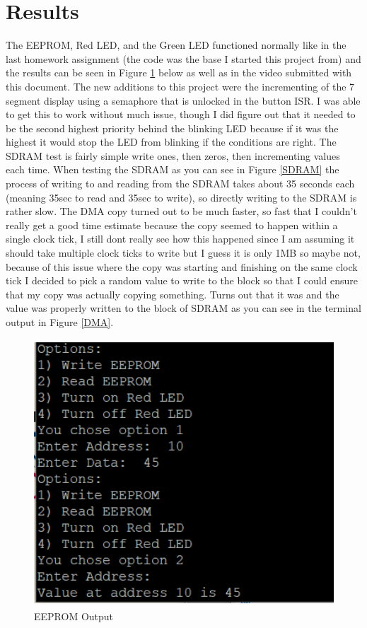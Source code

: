 \documentclass[10pt,a4paper]{article}
\begin{document}
	\section{Results}
	The EEPROM, Red LED, and the Green LED functioned normally like in the last homework assignment (the code was the base I started this project from) and the results can be seen in Figure \ref{EEPROM} below as well as in the video submitted with this document. The new additions to this project were the incrementing of the 7 segment display using a semaphore that is unlocked in the button ISR. I was able to get this to work without much issue, though I did figure out that it needed to be the second highest priority behind the blinking LED because if it was the highest it would stop the LED from blinking if the conditions are right. The SDRAM test is fairly simple write ones, then zeros, then incrementing values each time. When testing the SDRAM as you can see in Figure \ref{SDRAM} the process of writing to and reading from the SDRAM takes about 35 seconds each (meaning 35sec to read and 35sec to write), so directly writing to the SDRAM is rather slow. The DMA copy turned out to be much faster, so fast that I couldn't really get a good time estimate because the copy seemed to happen within a single clock tick, I still dont really see how this happened since I am assuming it should take multiple clock ticks to write but I guess it is only 1MB so maybe not, because of this issue where the copy was starting and finishing on the same clock tick I decided to pick a random value to write to the block so that I could ensure that my copy was actually copying something. Turns out that it was and the value was properly written to the block of SDRAM as you can see in the terminal output in Figure \ref{DMA}. 
	
	\begin{figure}[H]
		\centering\includegraphics[height=10cm]{EEPROM_Term_Output.png}
		\caption{EEPROM Output}
		\label{EEPROM}
	\end{figure}
\end{document}

